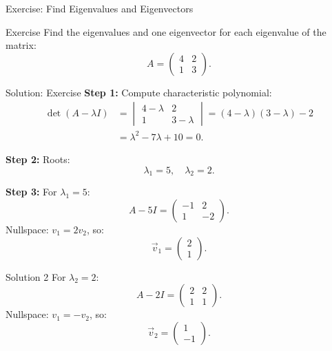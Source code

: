 \documentclass{beamer}
\begin{document}
	\begin{frame}{Exercise: Find Eigenvalues and Eigenvectors}
		\begin{block}{Exercise}
		Find the eigenvalues and one eigenvector for each eigenvalue of the matrix:
			\begin{equation}
			A =
			\begin{pmatrix} 4 & 2 \\ 1 & 3 \end{pmatrix}.
			\end{equation}
		\end{block}
	\end{frame}

	\begin{frame}{Solution: Exercise}
	\textbf{Step 1:} Compute characteristic polynomial:
		\begin{align}
		\det(A-\lambda I) &=
		\begin{vmatrix}4-\lambda &2 \\1 &3-\lambda\end{vmatrix} =
		(4-\lambda)(3-\lambda)-2 \\
		&= \lambda^2 -7\lambda+10=0.
		\end{align}
	
	\textbf{Step 2:} Roots:
		\begin{equation}
		\lambda_1=5, \quad \lambda_2=2.
		\end{equation}
	
	\textbf{Step 3:} For \(\lambda_1=5\):
		\begin{equation}
		A-5I =
		\begin{pmatrix}-1&2\\1&-2\end{pmatrix}.
		\end{equation}
	Nullspace: \(v_1=2v_2\), so:
		\begin{equation}
		\vec{v}_1 =
		\begin{pmatrix}2\\1\end{pmatrix}.
		\end{equation}
	\end{frame}

	\begin{frame}{Solution 2}
	For \(\lambda_2=2\):
		\begin{equation}
		A-2I =
		\begin{pmatrix}2&2\\1&1\end{pmatrix}.
		\end{equation}
	Nullspace: \(v_1=-v_2\), so:
		\begin{equation}
		\vec{v}_2 =
		\begin{pmatrix}1\\-1\end{pmatrix}.
		\end{equation}
	\end{frame}
\end{document}
